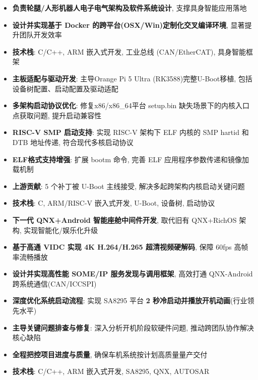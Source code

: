 \documentclass{resume}
\begin{document}
\begin{itemize}
  \item \textbf{负责轮腿/人形机器人电子电气架构及软件系统设计}, 支撑具身智能应用落地
  \item \textbf{设计并实现基于 Docker 的跨平台(OSX/Win)定制化交叉编译环境}, 显著提升团队开发效率
  \item \textbf{技术栈}: C/C++, ARM 嵌入式开发, 工业总线 (CAN/EtherCAT), 具身智能框架
\end{itemize}

\begin{itemize}
  \item \textbf{主板适配与驱动开发}: 主导Orange Pi 5 Ultra (RK3588)完整U-Boot移植, 包括设备树配置、启动配置及驱动适配
  \item \textbf{多架构启动协议优化}: 修复x86/x86\_64平台 setup.bin 缺失场景下的内核入口点获取问题, 提升启动兼容性
  \item \textbf{RISC-V SMP 启动支持}: 实现 RISC-V 架构下 ELF 内核的 SMP hartid 和 DTB 地址传递, 符合现代多核启动协议
  \item \textbf{ELF格式支持增强}: 扩展 bootm 命令, 完善 ELF 应用程序参数传递和镜像加载机制
  \item \textbf{上游贡献}: 5 个补丁被 U-Boot 主线接受, 解决多起跨架构内核启动关键问题
  \item \textbf{技术栈}: C, ARM/RISC-V 嵌入式开发, U-Boot, 设备树, 启动协议
\end{itemize}

\begin{itemize}
  \item \textbf{下一代 QNX+Android 智能座舱中间件开发}, 取代旧有 QNX+RichOS 架构, 实现智能化/娱乐化升级
  \item \textbf{基于高通 VIDC 实现 4K H.264/H.265 超清视频硬解码}, 保障 60fps 高帧率流畅播放
  \item \textbf{设计并实现高性能 SOME/IP 服务发现与调用框架}, 高效打通 QNX-Android 跨系统通信(CAN/ICCSPI)
  \item \textbf{深度优化系统启动流程}: 实现 SA8295 平台 \textbf{2 秒冷启动并播放开机动画}(行业领先水平)
  \item \textbf{主导关键问题排查与修复}: 深入分析开机阶段软硬件问题, 推动跨团队协作解决核心缺陷
  \item \textbf{全程把控项目进度与质量}, 确保车机系统按计划高质量量产交付
  \item \textbf{技术栈}: C/C++, ARM 嵌入式开发, SA8295, QNX, AUTOSAR
\end{itemize}
\end{document}
